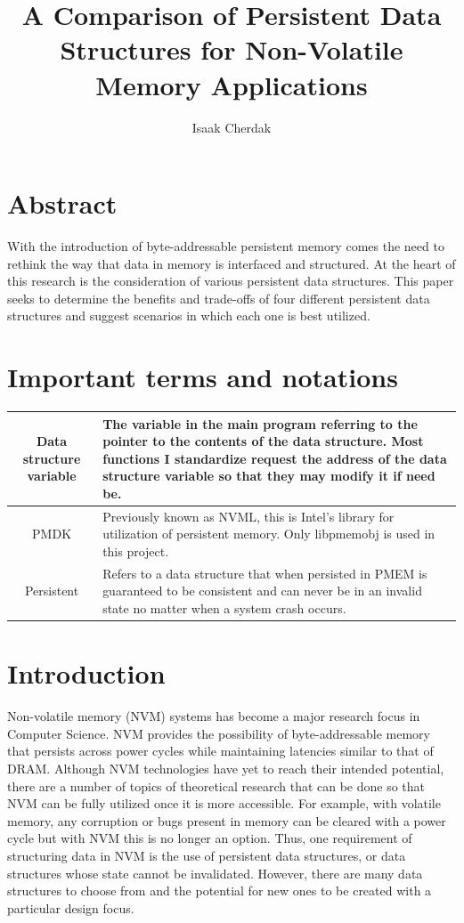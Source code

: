 \documentclass[twocolumn]{article}
\title{A Comparison of Persistent Data Structures for Non-Volatile Memory
Applications}
\author{Isaak Cherdak}
\begin{document}
\maketitle

\section*{Abstract}

With the introduction of byte-addressable persistent memory comes the need to
rethink the way that data in memory is interfaced and structured. At the heart
of this research is the consideration of various persistent data structures.
This paper seeks to determine the benefits and trade-offs of four different
persistent data structures and suggest scenarios in which each one is best
utilized.

\section*{Important terms and notations}

\begin{center}
  \begin{tabularx}{\linewidth}{ | c | X | }
    \hline
    Data structure variable & The variable in the main program referring to the
    pointer to the contents of the data structure. Most functions I standardize
    request the address of the data structure variable so that they may modify
    it if need be.\\ \hline

    PMDK & Previously known as NVML, this is Intel's library for utilization of
    persistent memory. Only libpmemobj is used in this project.\\ \hline

    Persistent & Refers to a data structure that when persisted in PMEM is
    guaranteed to be consistent and can never be in an invalid state no matter
    when a system crash occurs. \\ \hline
  \end{tabularx}
\end{center}

\section{Introduction}

Non-volatile memory (NVM) systems has become a major research focus in Computer
Science. NVM provides the possibility of byte-addressable memory that persists
across power cycles while maintaining latencies similar to that of DRAM.
Although NVM technologies have yet to reach their intended potential, there are
a number of topics of theoretical research that can be done so that NVM can be
fully utilized once it is more accessible. For example, with volatile memory,
any corruption or bugs present in memory can be cleared with a power cycle but
with NVM this is no longer an option. Thus, one requirement of structuring data
in NVM is the use of persistent data structures, or data structures whose state
cannot be invalidated. However, there are many data structures to choose from
and the potential for new ones to be created with a particular design focus.
\end{document}
